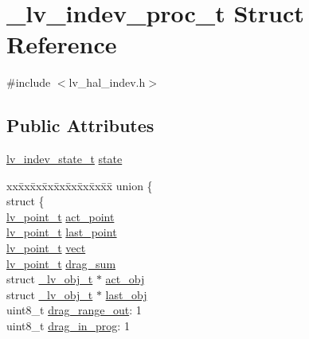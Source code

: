 \hypertarget{struct__lv__indev__proc__t}{}\section{\+\_\+lv\+\_\+indev\+\_\+proc\+\_\+t Struct Reference}
\label{struct__lv__indev__proc__t}


{\ttfamily \#include $<$lv\+\_\+hal\+\_\+indev.\+h$>$}

\subsection*{Public Attributes}
\begin{DoxyCompactItemize}
\item 
\mbox{\hyperlink{lv__hal__indev_8h_aacdf3efce400e71895f5efb42ee24956}{lv\+\_\+indev\+\_\+state\+\_\+t}} \mbox{\hyperlink{struct__lv__indev__proc__t_a993ced14d531f55381346cebf8a978d8}{state}}
\item 
\begin{tabbing}
xx\=xx\=xx\=xx\=xx\=xx\=xx\=xx\=xx\=\kill
union \{\\
\>struct \{\\
\>\>\mbox{\hyperlink{structlv__point__t}{lv\_point\_t}} \mbox{\hyperlink{struct__lv__indev__proc__t_a07c31da6ce2d8bf13495979a4cfde167}{act\_point}}\\
\>\>\mbox{\hyperlink{structlv__point__t}{lv\_point\_t}} \mbox{\hyperlink{struct__lv__indev__proc__t_a1cdaaba80366c5e69643ce39e9ccfe54}{last\_point}}\\
\>\>\mbox{\hyperlink{structlv__point__t}{lv\_point\_t}} \mbox{\hyperlink{struct__lv__indev__proc__t_a311ca773c25e7719b27ec09a36bf17e1}{vect}}\\
\>\>\mbox{\hyperlink{structlv__point__t}{lv\_point\_t}} \mbox{\hyperlink{struct__lv__indev__proc__t_a1e747cc08454e61d9dfb2a6b71ed4b90}{drag\_sum}}\\
\>\>struct \mbox{\hyperlink{struct__lv__obj__t}{\_lv\_obj\_t}} $\ast$ \mbox{\hyperlink{struct__lv__indev__proc__t_a418af1d0a3452e6c97d22f6a690c2927}{act\_obj}}\\
\>\>struct \mbox{\hyperlink{struct__lv__obj__t}{\_lv\_obj\_t}} $\ast$ \mbox{\hyperlink{struct__lv__indev__proc__t_a31f25629da14f973a050f3723b47bb53}{last\_obj}}\\
\>\>uint8\_t \mbox{\hyperlink{struct__lv__indev__proc__t_a26b3c9d0f7e55e3cdd7b6bfa9b405229}{drag\_range\_out}}: 1\\
\>\>uint8\_t \mbox{\hyperlink{struct__lv__indev__proc__t_a4be20f577cc3ee6f283d25da9037b444}{drag\_in\_prog}}: 1\\

\end{tabbing}
\end{DoxyCompactItemize}
